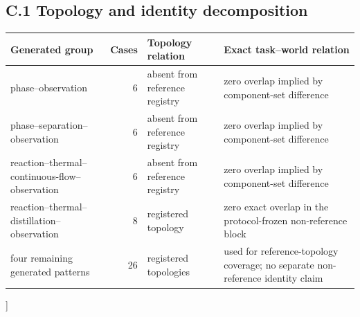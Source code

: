 \documentclass[10pt,twocolumn]{article}
\begin{document}
\begin{@twocolumnfalse}
\subsection{C.1 Topology and identity decomposition}\label{appendix-c.1-topology-and-identity}
\centering
\small
\captionsetup{hypcap=false}
\label{tab:novelty-decomposition}
\begin{tabularx}{\textwidth}{@{}L{0.33\textwidth}rL{0.22\textwidth}Y@{}}
\toprule
Generated group & Cases & Topology relation & Exact task--world relation \\
\midrule
phase--observation & 6 & absent from reference registry & zero overlap implied by component-set difference \\
phase--separation--observation & 6 & absent from reference registry & zero overlap implied by component-set difference \\
reaction--thermal--continuous-flow--observation & 6 & absent from reference registry & zero overlap implied by component-set difference \\
reaction--thermal--distillation--observation & 8 & registered topology & zero exact overlap in the protocol-frozen non-reference block \\
four remaining generated patterns & 26 & registered topologies & used for reference-topology coverage; no separate non-reference identity claim \\
\bottomrule
\end{tabularx}
\end{@twocolumnfalse}
]
\end{document}
